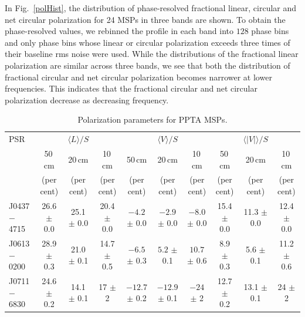 \documentclass[useAMS,usenatbib]{mn2e}
\begin{document}
In Fig.~\ref{polHist}, the distribution of phase-resolved fractional linear, 
circular and net circular polarization for 24 MSPs in three bands are shown.
%
To obtain the phase-resolved values, we rebinned the profile in each band into 
$128$ phase bins and only phase bins whose linear or circular polarization 
exceeds three times of their baseline rms noise were used. 
%
While the distributions of the fractional linear polarization are similar 
across three bands, we see that both the distribution of fractional circular 
and net circular polarization becomes narrower at lower 
frequencies. 
%
This indicates that the fractional circular and net circular polarization 
decrease as decreasing frequency.

%
\begin{table}
\begin{center}
\caption{Polarization parameters for PPTA MSPs.}
\label{tablePol}
\begin{tabular}{lccccccccc}
\hline
PSR              &                  &    $\langle L \rangle/S$    &                  &               & $\langle V \rangle/S$       &                  &      &      $\langle|V|\rangle/S$       &                      \\
								 &    50\,cm      &   20\,cm       &    10\,cm &    50\,cm      &   20\,cm       &    10\,cm &    50\,cm      &   20\,cm       &    10\,cm              \\
								 &     (per cent)   &         (per cent)          &     (per cent)   &    (per cent)   &         (per cent)          &     (per cent)   &   (per cent)   &         (per cent)          &     (per cent)  \\
\hline
J0437$-$4715& 26.6 $\pm$ 0.0& 25.1 $\pm $ 0.0& 20.4 $\pm$ 0.0&$ -4.2$ $\pm$ 0.0 &$ -2.9$ $\pm$ 0.0 &$ -8.0$ $\pm$ 0.0 & 15.4 $\pm$ 0.0 & 11.3 $\pm$ 0.0 & 12.4 $\pm$ 0.0 \\
J0613$-$0200& 28.9 $\pm$ 0.3& 21.0 $\pm $ 0.1& 14.7 $\pm$ 0.5&$ -6.5$ $\pm$ 0.3 &$ 5.2 $ $\pm$ 0.1 &$ 10.7$ $\pm$ 0.6 &  8.9 $\pm$ 0.3 &  5.6 $\pm$ 0.1 & 11.2 $\pm$ 0.6 \\
J0711$-$6830& 24.6 $\pm$ 0.2& 14.1 $\pm $ 0.1& 17   $\pm$ 2  &$-12.7$ $\pm$ 0.2 &$-12.9$ $\pm$ 0.1 &$ -24 $ $\pm$ 2   & 12.7 $\pm$ 0.2 & 13.1 $\pm$ 0.1 & 24   $\pm$ 2 \\

\end{tabular}
\end{center}
\end{table}
\end{document}
